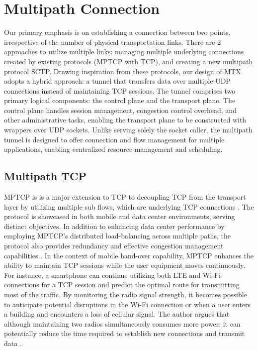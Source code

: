 \section{Multipath Connection}
Our primary emphasis is on establishing a connection between two points, irrespective of the number of physical transportation links.
There are 2 approaches to utilize multiple links: managing multiple underlying connections created by existing protocols (\ac{MPTCP} with TCP), and creating a new multipath protocol \ac{SCTP}.
Drawing inspiration from these protocols, our design of \ac{MTX} adopts a hybrid approach: a tunnel that transfers data over multiple UDP connections instead of maintaining TCP sessions. 
The tunnel comprises two primary logical components: the control plane and the transport plane. 
The control plane handles session management, congestion control overhead, and other administrative tasks, enabling the transport plane to be constructed with wrappers over UDP sockets.
Unlike serving solely the socket caller, the multipath tunnel is designed to offer connection and flow management for multiple applications, enabling centralized resource management and scheduling.

\subsection{Multipath TCP}

\ac{MPTCP} is is a major extension to TCP to decoupling TCP from the transport layer by utilizing multiple sub flows, which are underlying TCP connections \cite{Bonaventure_mptcp_decoupling}.
The protocol is showcased in both mobile and data center environments, serving distinct objectives. 
In addition to enhancing data center performance by employing \ac{MPTCP}'s distributed load-balancing across multiple paths, the protocol also provides redundancy and effective congestion management capabilities \cite{raiciu_improving_nodate}.
In the context of mobile hand-over capability, \ac{MPTCP} enhances the ability to maintain TCP sessions while the user equipment moves continuously. 
For instance, a smartphone can continue utilizing both LTE and Wi-Fi connections for a TCP session and predict the optimal route for transmitting most of the traffic. 
By monitoring the radio signal strength, it becomes possible to anticipate potential disruptions in the Wi-Fi connection or when a user enters a building and encounters a loss of cellular signal. 
The author argues that although maintaining two radios simultaneously consumes more power, it can potentially reduce the time required to establish new connections and transmit data \cite{paasch_multipath_2014}.


